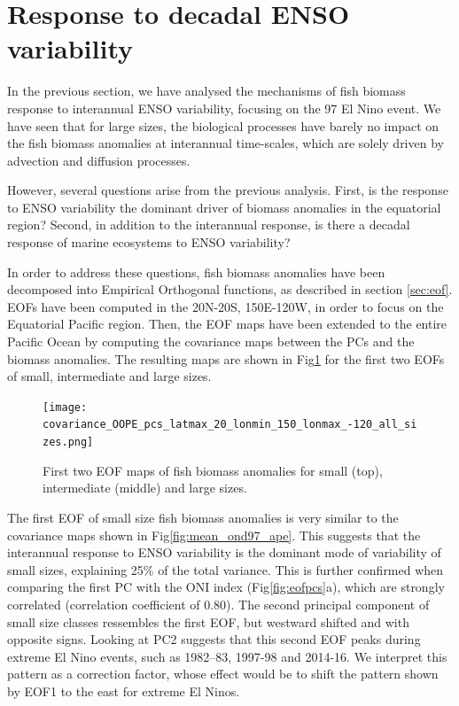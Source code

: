 \section{Response to decadal ENSO variability}

In the previous section, we have analysed the mechanisms of fish biomass response to interannual ENSO variability, focusing on the 97 El Nino event. We have seen that for large sizes, the biological processes have barely no impact on the fish biomass anomalies at interannual time-scales, which are solely driven by advection and diffusion processes.

However, several questions arise from the previous analysis. First, is the response to ENSO variability the dominant driver of biomass anomalies in the equatorial region? Second, in addition to the interannual response, is there a decadal response of marine ecosystems to ENSO variability?

In order to address these questions, fish biomass anomalies have been decomposed into Empirical Orthogonal functions, as described in section \ref{sec:eof}. EOFs have been computed in the 20N-20S, 150E-120W, in order to focus on the Equatorial Pacific region. Then, the EOF maps have been extended to the entire Pacific Ocean by computing the covariance maps between the PCs and the biomass anomalies. The resulting maps are shown in Fig\ref{fig:eofmaps} for the first two EOFs of small, intermediate and large sizes.

\begin{figure}
    \centering
    \texttt{[image: covariance\_OOPE\_pcs\_latmax\_20\_lonmin\_150\_lonmax\_-120\_all\_sizes.png]}
    \caption{First two EOF maps of fish biomass anomalies for small (top), intermediate (middle) and large sizes.}
    \label{fig:eofmaps}
\end{figure}

The first EOF of small size fish biomass anomalies is very similar to the covariance maps shown in Fig\ref{fig:mean_ond97_ape}. This suggests that the interannual response to ENSO variability is the dominant mode of variability of small sizes, explaining 25\% of the total variance. This is further confirmed when comparing the first PC with the ONI index (Fig\ref{fig:eofpcs}a), which are strongly correlated (correlation coefficient of 0.80). The second principal component of small size classes ressembles the first EOF, but westward shifted and with opposite signs. Looking at PC2 suggests that this second EOF peaks during extreme El Nino events, such as 1982–83, 1997-98 and 2014-16. We interpret this pattern as a correction factor, whose effect would be to shift the pattern shown by EOF1 to the east for extreme El Ninos.

